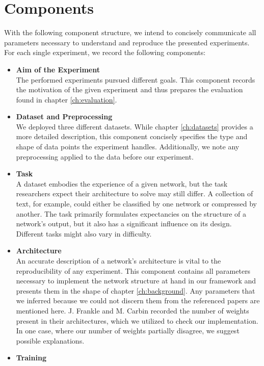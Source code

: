 \section{Components}
With the following component structure, we intend to concisely communicate all parameters necessary to understand and reproduce the presented experiments. For each single experiment, we record the following components:
\begin{itemize}
	\item \textbf{Aim of the Experiment}\\
	The performed experiments pursued different goals. This component records the motivation of the given experiment and thus prepares the evaluation found in chapter \ref{ch:evaluation}.\\
	\item \textbf{Dataset and Preprocessing}\\
	We deployed three different datasets. While chapter \ref{ch:datasets} provides a more detailed description, this component concisely specifies the type and shape of data points the experiment handles. Additionally, we note any preprocessing applied to the data before our experiment.\\
	\item \textbf{Task}\\
	A dataset embodies the experience of a given network, but the task researchers expect their architecture to solve may still differ. A collection of text, for example, could either be classified by one network or compressed by another. The task primarily formulates expectancies on the structure of a network's output, but it also has a significant influence on its design. Different tasks might also vary in difficulty.\\
	\item \textbf{Architecture}\\
	An accurate description of a network's architecture is vital to the reproducibility of any experiment. This component contains all parameters necessary to implement the network structure at hand in our framework and presents them in the shape of chapter \ref{ch:background}. Any parameters that we inferred because we could not discern them from the referenced papers are mentioned here.
	J. Frankle and M. Carbin recorded the number of weights present in their architectures, which we utilized to check our implementation. In one case, where our number of weights partially disagree, we suggest possible explanations.\\
	\item \textbf{Training}\\  

\end{itemize}
